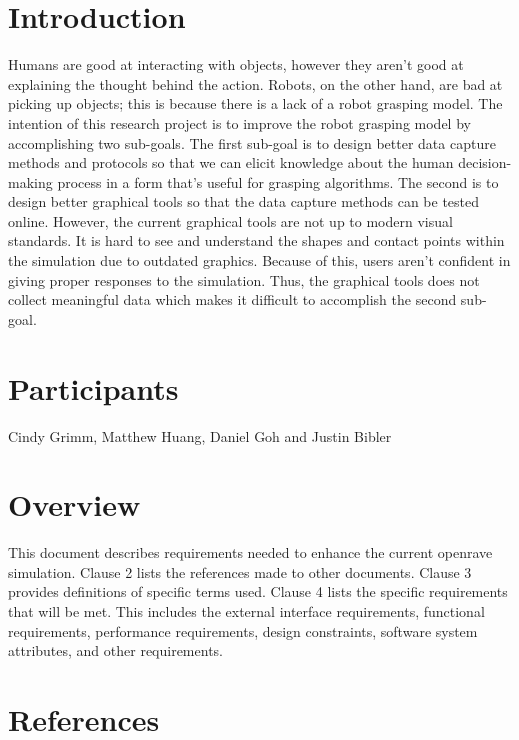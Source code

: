 \documentclass[10pt,journal,compsoc]{IEEEtran}
\begin{document}
\section*{Introduction}
Humans are good at interacting with objects, however they aren't good at explaining the thought behind the action.
Robots, on the other hand, are bad at picking up objects; this is because there is a lack of a robot grasping model.
The intention of this research project is to improve the robot grasping model by accomplishing two sub-goals.
The first sub-goal is to design better data capture methods and protocols so that we can elicit knowledge about the human decision-making process in a form that's useful for grasping algorithms.
The second is to design better graphical tools so that the data capture methods can be tested online.
However, the current graphical tools are not up to modern visual standards.
It is hard to see and understand the shapes and contact points within the simulation due to outdated graphics.
Because of this, users aren't confident in giving proper responses to the simulation.
Thus, the graphical tools does not collect meaningful data which makes it difficult to accomplish the second sub-goal. \\

\section*{Participants}
Cindy Grimm, Matthew Huang, Daniel Goh and Justin Bibler \\ 


\newpage

\tableofcontents

\newpage

\section{Overview}
This document describes requirements needed to enhance the current openrave simulation. 
Clause 2 lists the references made to other documents. 
Clause 3 provides definitions of specific terms used.
Clause 4 lists the specific requirements that will be met.
This includes the external interface requirements, functional requirements, performance requirements, design constraints, software system attributes, and other requirements.

\vfill

\section{References}
\end{document}

